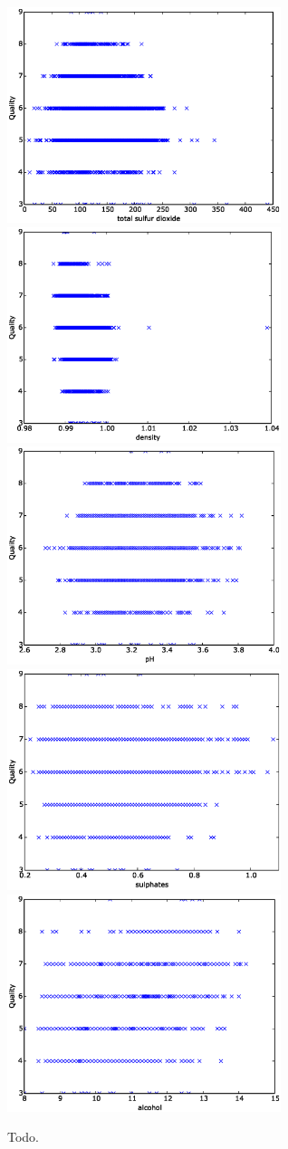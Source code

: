 \documentclass[11pt]{article}
\begin{document}
\begin{figure}[h]
  \centering
  \includegraphics[width=8cm]{total_sulfur_dioxide.eps}
  \includegraphics[width=8cm]{density.eps}
  \includegraphics[width=8cm]{pH.eps}
  \includegraphics[width=8cm]{sulphates.eps}
  \includegraphics[width=8cm]{alcohol.eps}
  \caption{Todo.}
  \label{fig:todo}
\end{figure}
\end{document}
